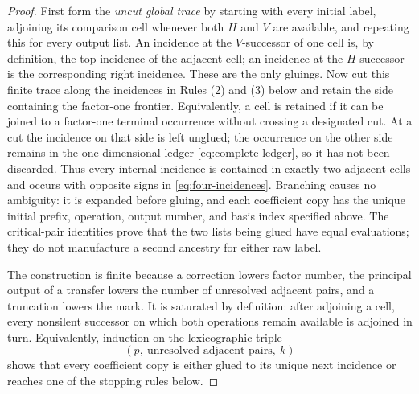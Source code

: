 \documentclass[11pt]{amsart}
\theoremstyle{remark}
\begin{document}
\begin{proof}
	First form the \emph{uncut global trace} by starting with every initial
	label, adjoining its comparison cell whenever both $H$ and $V$ are
	available, and repeating this for every output list.  An incidence at
	the $V$-successor of one cell is, by definition, the top incidence of
	the adjacent cell; an incidence at the $H$-successor is the corresponding
	right incidence.  These are the only gluings.  Now cut this finite trace
	along the incidences in Rules (2) and (3) below and retain the side
	containing the factor-one frontier.  Equivalently, a cell is retained if
	it can be joined to a factor-one terminal occurrence without crossing a
	designated cut.  At a cut the incidence on that side is left unglued;
	the occurrence on the other side remains in the one-dimensional ledger
	\eqref{eq:complete-ledger}, so it has not been discarded.  Thus every internal
	incidence is contained in exactly two adjacent cells and occurs with
	opposite signs in \eqref{eq:four-incidences}.  Branching causes no
	ambiguity: it is expanded before gluing, and each coefficient copy has
	the unique initial prefix, operation, output number, and basis index
	specified above.  The critical-pair identities prove that the two lists
	being glued have equal evaluations; they do not manufacture a second
	ancestry for either raw label.

	The construction is finite because a correction lowers factor number,
	the principal output of a transfer lowers the number of unresolved
	adjacent pairs, and a truncation lowers the mark.  It is saturated by
	definition: after adjoining a cell, every nonsilent successor on which
	both operations remain available is adjoined in turn.  Equivalently,
	induction on the lexicographic triple
	\[
	 (p,\ \text{unresolved adjacent pairs},\ k)
	\]
	shows that every coefficient copy is either glued to its unique next
	incidence or reaches one of the stopping rules below.


\end{proof}
\end{document}
